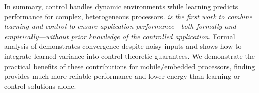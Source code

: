 In summary, control handles dynamic environments while learning
predicts performance for complex, heterogeneous processors.
\emph{\SYSTEM{} is the first work to combine learning and control to
  ensure application performance---both formally and
  empirically---without prior knowledge of the controlled
  application.}  Formal analysis of \SYSTEM{} demonstrates convergence
despite noisy inputs and shows how to integrate learned variance into
control theoretic guarantees.  We demonstrate the practical benefits
of these contributions for mobile/embedded processors, finding
\SYSTEM{} provides much more reliable performance and lower energy
than learning or control solutions alone.


